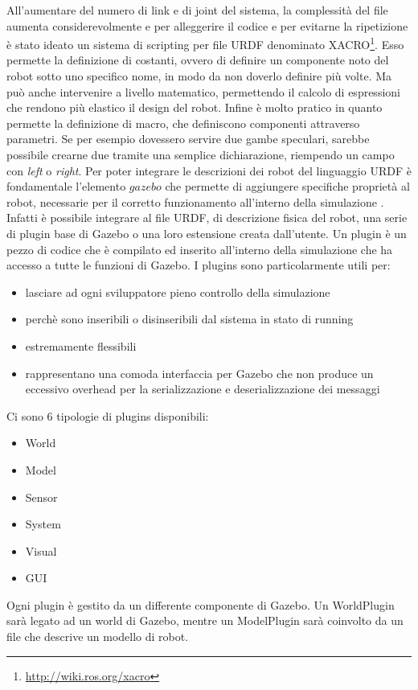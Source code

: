 \documentclass[a4paper,11 pt,oneside]{book}
\theoremstyle{definition}
\begin{document}
All'aumentare del numero di link e di joint del sistema, la complessità del file aumenta considerevolmente e per alleggerire il codice e per evitarne la ripetizione è stato ideato un sistema di scripting per file URDF denominato XACRO\footnote{\url{http://wiki.ros.org/xacro}}. Esso permette la definizione di costanti, ovvero di definire un componente noto del robot sotto uno specifico nome, in modo da non doverlo definire più volte. Ma può anche intervenire a livello matematico, permettendo il calcolo di espressioni che rendono più elastico il design del robot. Infine è molto pratico in quanto permette la definizione di macro, che definiscono componenti attraverso parametri. Se per esempio dovessero servire due gambe speculari, sarebbe possibile crearne due tramite una semplice dichiarazione, riempendo un campo con \emph{left} o \emph{right}.
Per poter integrare le descrizioni dei robot del linguaggio URDF è fondamentale l'elemento $gazebo$ che permette di aggiungere specifiche proprietà al robot, necessarie per il corretto funzionamento all'interno della simulazione .
Infatti è possibile integrare al file URDF, di descrizione fisica del robot, una serie di plugin base di Gazebo o una loro estensione creata dall'utente.
Un plugin è un pezzo di codice che è compilato ed inserito all'interno della simulazione che ha accesso a tutte le funzioni di Gazebo.
I plugins sono particolarmente utili per:
\begin{itemize}
  \item lasciare ad ogni sviluppatore pieno controllo della simulazione
  \item perchè sono inseribili o disinseribili dal sistema in stato di running
  \item estremamente flessibili
  \item rappresentano una comoda interfaccia per Gazebo che non produce un eccessivo overhead per la serializzazione e deserializzazione dei messaggi
\end{itemize}
Ci sono 6 tipologie di plugins disponibili:
\begin{itemize}
  \item World
  \item Model
  \item Sensor
  \item System
  \item Visual
  \item GUI
\end{itemize}
Ogni plugin è gestito da un differente componente di Gazebo. Un WorldPlugin sarà legato ad un world di Gazebo, mentre un ModelPlugin sarà coinvolto da un file che descrive un modello di robot.
\end{document}

